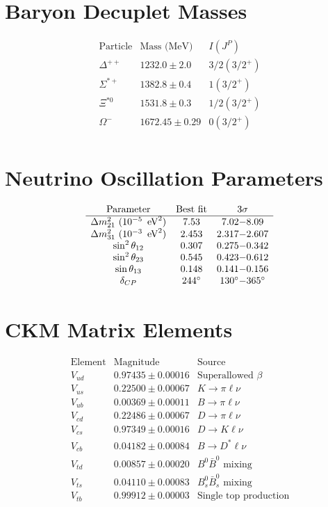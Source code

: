 \section{Baryon Decuplet Masses}

\[
\begin{array}{ccc}
\text{Particle} & \text{Mass (MeV)} & I(J^P) \\
\hline
\Delta^{++} & 1232.0 \pm 2.0 & 3/2(3/2^+) \\
\Sigma^{*+} & 1382.8 \pm 0.4 & 1(3/2^+) \\
\Xi^{*0} & 1531.8 \pm 0.3 & 1/2(3/2^+) \\
\Omega^- & 1672.45 \pm 0.29 & 0(3/2^+) \\
\end{array}
\]

\section{Neutrino Oscillation Parameters}

\[
\begin{array}{ccc}
\text{Parameter} & \text{Best fit} & 3\sigma \\
\hline
\Delta m_{21}^2\ (10^{-5}\ \,\text{eV}^2) & 7.53 & 7.02{-}8.09 \\
\Delta m_{31}^2\ (10^{-3}\ \,\text{eV}^2) & 2.453 & 2.317{-}2.607 \\
\sin^2\theta_{12} & 0.307 & 0.275{-}0.342 \\
\sin^2\theta_{23} & 0.545 & 0.423{-}0.612 \\
\sin\theta_{13} & 0.148 & 0.141{-}0.156 \\
\delta_{CP} & 244^\circ & 130^\circ{-}365^\circ \\
\end{array}
\]

\section{CKM Matrix Elements}

\[
\begin{array}{ccc}
\text{Element} & \text{Magnitude} & \text{Source} \\
\hline
V_{ud} & 0.97435 \pm 0.00016 & \text{Superallowed } \beta \\
V_{us} & 0.22500 \pm 0.00067 & K \to \pi\ell\nu \\
V_{ub} & 0.00369 \pm 0.00011 & B \to \pi\ell\nu \\
V_{cd} & 0.22486 \pm 0.00067 & D \to \pi\ell\nu \\
V_{cs} & 0.97349 \pm 0.00016 & D \to K\ell\nu \\
V_{cb} & 0.04182 \pm 0.00084 & B \to D^*\ell\nu \\
V_{td} & 0.00857 \pm 0.00020 & B^0\bar{B}^0 \text{ mixing} \\
V_{ts} & 0.04110 \pm 0.00083 & B_s^0\bar{B}_s^0 \text{ mixing} \\
V_{tb} & 0.99912 \pm 0.00003 & \text{Single top production} \\
\end{array}
\]


